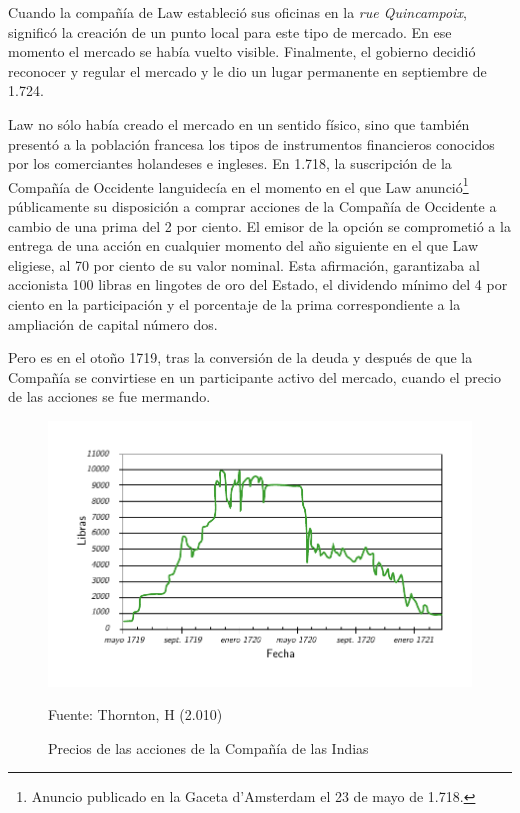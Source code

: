 Cuando la compañía de Law estableció sus oficinas en la \emph{rue Quincampoix}, significó la creación de un punto local para este tipo de mercado. En ese momento el mercado se había vuelto visible. Finalmente, el gobierno decidió reconocer y regular el mercado y le dio un lugar permanente en septiembre de 1.724.

Law no sólo había creado el mercado en un sentido físico, sino que también presentó a la población francesa los tipos de instrumentos financieros conocidos por los comerciantes holandeses e ingleses. En 1.718, la suscripción de la Compañía de Occidente languidecía en el momento en el que Law anunció\footnote{Anuncio publicado en la Gaceta d'Amsterdam el 23 de mayo de 1.718.} públicamente su disposición a comprar acciones de la Compañía de Occidente a cambio de una prima del 2 por ciento. El emisor de la opción se comprometió a la entrega de una acción en cualquier momento del año siguiente en el que Law eligiese, al 70 por ciento de su valor nominal. Esta afirmación, garantizaba al accionista 100 libras en lingotes de oro del Estado, el dividendo mínimo del 4 por ciento en la participación y el porcentaje de la prima correspondiente a la ampliación de capital número dos.

Pero es en el otoño 1719, tras la conversión de la deuda y después de que la Compañía se convirtiese en un participante activo del mercado, cuando el precio de las acciones se fue mermando.

\begin{figure}[!h] 
\caption{Precios de las acciones de la Compañía de las Indias} 
\centering \includegraphics[width=150mm]{capitulos/graficos/preciosAccionesIndias} 
\label{fig:preciosAccionesIndias} 

	\footnotesize
	Fuente: Thornton, H (2.010)

\end{figure}

